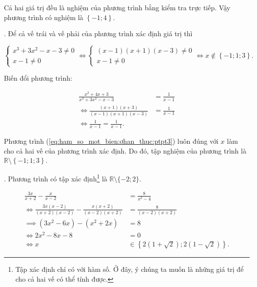 Cả hai giá trị đều là nghiệm của phương trình bằng kiểm tra trực tiếp. Vậy phương trình có nghiệm là $\left\{-1; 4\right\}$.

. Để cả vế trái và vế phải của phương trình xác định giá trị thì

\begin{equation*}
   \begin{cases}
      x^3 + 3x^2 - x - 3 \neq 0 \\
      x - 1 \neq 0
   \end{cases} \iff 
   \begin{cases}
      (x - 1)(x + 1)(x - 3) \neq 0 \\
      x - 1 \neq 0
   \end{cases}
   \iff x \notin \left\{-1; 1; 3\right\}.
\end{equation*}

Biến đổi phương trình:

\begin{align}
   \frac{x^2 + 4x + 3}{x^3 + 3x^2 -x - 3} &= \frac{1}{x - 1} \nonumber\\
   \iff \frac{(x + 1)(x + 3)}{(x - 1)(x + 1)(x - 3)} &= \frac{1}{x - 1} \nonumber\\
   \iff \frac{1}{x - 1} = \frac{1}{x - 1}. \label{eq:ham_so_mot_bien:ơhan_thuc:ptpt3}
\end{align}

Phương trình (\ref{eq:ham_so_mot_bien:ơhan_thuc:ptpt3}) luôn đúng với $x$ làm cho cả hai vế của phương trình xác định. Do đó, tập nghiệm của phương trình là $\mathbb{R} \setminus \left\{-1; 1; 3\right\}$.

. Phương trình có tập xác định\footnote{Tập xác định chỉ có với hàm số. Ở đây, ý chúng ta muốn là những giá trị để cho cả hai vế có thể tính được.} là $\mathbb{R} \setminus \{-2; 2\}$.

\begin{align*}
   \frac{3x}{x + 2} - \frac{x}{x - 2} &= \frac{8}{x^2 - 4} \\
   \iff \frac{3x(x - 2)}{(x + 2)(x - 2)} - \frac{x(x + 2)}{(x - 2)(x + 2)} &= \frac{8}{(x - 2)(x + 2)} \\
   \implies \left(3x^2 - 6x\right) - \left(x^2 + 2x\right) &= 8 \\
   \iff 2x^2 - 8x - 8 &= 0 \\
   \iff x &\in \left\{2\left(1 + \sqrt{2}\right); 2(1 - \sqrt{2})\right\}.
\end{align*}

